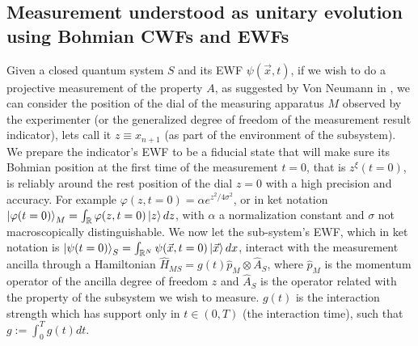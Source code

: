 \documentclass[11pt, a4paper]{article} %
\newcommand{\R}{\mathbb{R}} %
\begin{document}
\subsection*{Measurement understood as unitary evolution using Bohmian CWFs and EWFs}

Given a closed quantum system $S$ and its EWF $\psi(\vec{x},t)$, if we wish to do a projective measurement of the property $A$, as suggested by Von Neumann in \cite{VonNeumann}, we can consider the position of the dial of the measuring apparatus $M$ observed by the experimenter (or the generalized degree of freedom of the measurement result indicator), lets call it $z\equiv x_{n+1}$ (as part of the environment of the subsystem). We prepare the indicator's EWF to be a fiducial state that will make sure its Bohmian position at the first time of the measurement $t=0$, that is $z^\xi(t=0)$, is reliably around the rest position of the dial $z=0$ with a high precision and accuracy. For example $\varphi(z,t=0)=\alpha e^{z^2/4\sigma^2}$, or in ket notation $\ket{\varphi(t=0)}_M=\int_\R\varphi(z,t=0) \ket{z}dz$,  with $\alpha$ a normalization constant and $\sigma$ not macroscopically distinguishable. We now let the sub-system's EWF, which in ket notation is $\ket{\psi(t=0)}_S=\int_{\R^N}\psi(\vec{x},t=0)\ket{\vec{x}}dx$, interact with the measurement ancilla through a Hamiltonian $\hat{H}_{MS}=g(t)\hat{p}_M\otimes \hat{A}_S$, where $\hat{p}_M$ is the momentum operator of the ancilla degree of freedom $z$ and $\hat{A}_S$ is the operator related with the property of the subsystem we wish to measure. $g(t)$ is the interaction strength which has support only in $t\in(0,T)$ (the interaction time), such that $g:=\int_0^Tg(t)dt$. 
\end{document}
